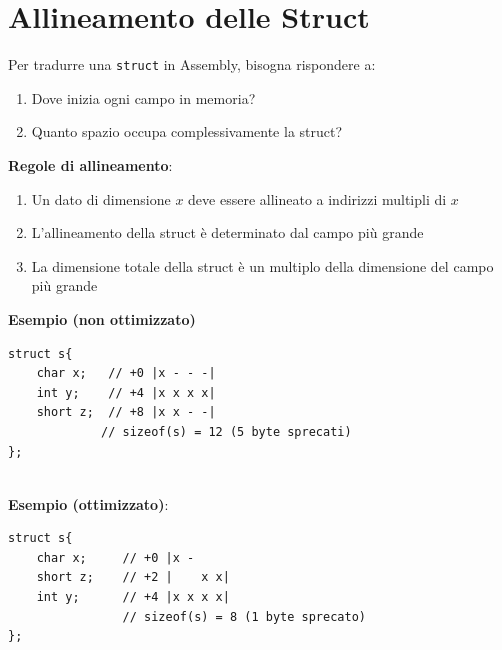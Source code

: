 \bigskip

\section{Allineamento delle Struct}

Per tradurre una \texttt{struct} in Assembly, bisogna rispondere a:

\begin{enumerate}
    \item Dove inizia ogni campo in memoria?
    \item Quanto spazio occupa complessivamente la struct?
\end{enumerate}

\noindent\textbf{Regole di allineamento}:
\begin{enumerate}
    \item Un dato di dimensione $x$ deve essere allineato a indirizzi multipli di $x$
    \item L'allineamento della struct è determinato dal campo più grande
    \item La dimensione totale della struct è un multiplo della dimensione del campo più grande
\end{enumerate}
\textbf{Esempio (non ottimizzato)}

\begin{minipage}{0.4\textwidth}
\begin{verbatim}
struct s{
    char x;   // +0 |x - - -|
    int y;    // +4 |x x x x|
    short z;  // +8 |x x - -|
             // sizeof(s) = 12 (5 byte sprecati)
};

\end{verbatim}
\end{minipage}\bigskip\\
\noindent\textbf{Esempio (ottimizzato)}:\medskip\\
\begin{minipage}{0.4\textwidth}
\begin{verbatim}
struct s{
    char x;     // +0 |x -    
    short z;    // +2 |    x x|
    int y;      // +4 |x x x x|
                // sizeof(s) = 8 (1 byte sprecato)
};

\end{verbatim}
\end{minipage}

